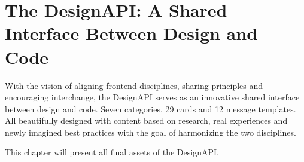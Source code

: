 \newpage
\section{The DesignAPI: A Shared Interface Between Design and Code}
With the vision of aligning frontend disciplines, sharing principles and encouraging interchange,
the DesignAPI serves as an innovative shared interface between design and code. Seven categories, 29
cards and 12 message templates. All beautifully designed with content based on research, real
experiences and newly imagined best practices with the goal of harmonizing the two disciplines.

This chapter will present all final assets of the DesignAPI.







